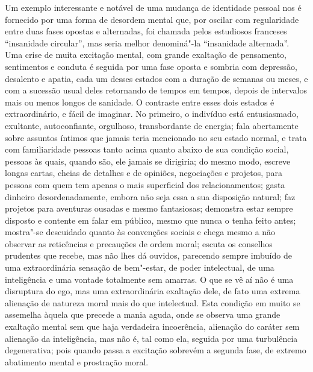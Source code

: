 Um exemplo interessante e notável de uma mudança de identidade pessoal
nos é fornecido por uma forma de desordem mental que, por oscilar com
regularidade entre duas fases opostas e alternadas, foi chamada pelos
estudiosos franceses “insanidade circular”, mas seria melhor
denominá"-la “insanidade alternada”.  Uma crise de muita excitação
mental, com grande exaltação de pensamento, sentimentos e conduta é
seguida por uma fase oposta e sombria com depressão, desalento e
apatia, cada um desses estados com a duração de semanas ou meses, e com
a sucessão usual deles retornando de tempos em tempos, depois de
intervalos mais ou menos longos de sanidade.  O contraste entre esses
dois estados é extraordinário, e fácil de imaginar.  No primeiro, o
indivíduo está entusiasmado, exultante, autoconfiante, orgulhoso,
transbordante de energia; fala abertamente sobre assuntos íntimos que
jamais teria mencionado no seu estado normal, e trata com familiaridade
pessoas tanto acima quanto abaixo de sua condição social, pessoas às
quais, quando são, ele jamais se dirigiria; do mesmo modo, escreve
longas cartas, cheias de detalhes e de opiniões, negociações e
projetos, para pessoas com quem tem apenas o mais superficial dos
relacionamentos; gasta dinheiro desordenadamente, embora não seja essa
a sua disposição natural; faz projetos para aventuras ousadas e mesmo
fantasiosas; demonstra estar sempre disposto e contente em falar em
público, mesmo que nunca o tenha feito antes; mostra"-se descuidado
quanto às convenções sociais e chega mesmo a não observar as
reticências e precauções de ordem moral; escuta os conselhos prudentes
que recebe, mas não lhes dá ouvidos, parecendo sempre imbuído de uma
extraordinária sensação de bem"-estar, de poder intelectual, de uma
inteligência e uma vontade totalmente sem amarras.  O que se vê aí não
é uma disruptura do ego, mas uma extraordinária exaltação dele, de fato
uma extrema alienação de natureza moral mais do que intelectual.  Esta
condição em muito se assemelha àquela que precede a mania aguda, onde
se observa uma grande exaltação mental sem que haja verdadeira
incoerência, alienação do caráter sem alienação da inteligência, mas
não é, tal como ela, seguida por uma turbulência degenerativa; pois
quando passa a excitação sobrevém a segunda fase, de extremo abatimento
mental e prostração moral. 

